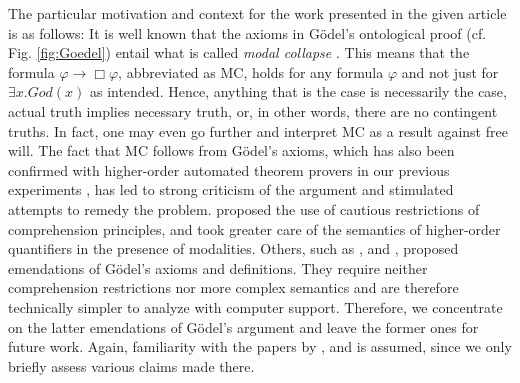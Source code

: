 \documentclass{birkjour}
\theoremstyle{definition}
\theoremstyle{remark}
\numberwithin{equation}{section}
\begin{document}
The particular motivation and context for the work presented in the given
article is as follows: It is well known that the axioms in G\"odel's
ontological proof (cf. Fig. \ref{fig:Goedel}) entail what is called
\emph{modal collapse} \citep{Sobel1987,SobelBook2004}. This means that
the formula $\varphi \rightarrow \Box \varphi$, abbreviated as MC,
holds for any formula $\varphi$ and not just for
$\exists x. \mathit{God}(x)$ as intended.  Hence, anything that is the case is necessarily the case, actual truth implies necessary truth, or, in other words, there are no
contingent truths. In fact, one may even go further and interpret MC as a result
against free will.
%
The fact that MC follows from Gödel's axioms, which has also been
confirmed with higher-order automated theorem provers in our previous
experiments \citep{C40,J30}, has led to strong criticism of the
argument and stimulated attempts to remedy the problem.
\citet{Hajek_Magari_and_others_1996,Hajek_der_Mathematiker_2001}
proposed the use of cautious restrictions of comprehension principles,
and \citet{fitting02:_types_tableaus_god} took greater care of the
semantics of higher-order quantifiers in the presence of
modalities. Others, such as
\citet{anderson90:_some_emend_of_goedel_ontol_proof},
\citet{Hajek2002} and \citet{bjordal99}, proposed emendations of
G\"odel's axioms and definitions. They require neither comprehension
restrictions nor more complex semantics and are therefore technically
simpler to analyze with computer support. Therefore, we concentrate
on the latter emendations of Gödel's argument and leave the former
ones for future work.  Again, familiarity with the papers by
\citet{anderson90:_some_emend_of_goedel_ontol_proof},
\citet{Hajek2002} and \citet{bjordal99} is assumed, since we only
briefly assess various claims made there.
\end{document}
